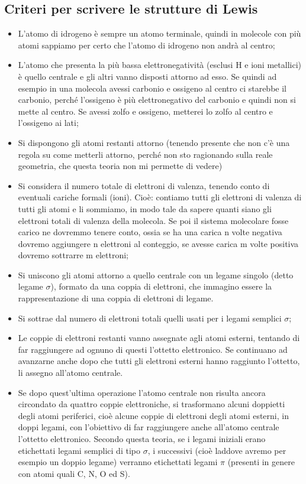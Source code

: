\subsection{Criteri per scrivere le strutture di Lewis}
\begin{itemize}
    \item L'atomo di idrogeno è sempre un atomo terminale, quindi in molecole con più atomi sappiamo per certo che l'atomo di idrogeno non andrà al centro;
    \item L'atomo che presenta la più bassa elettronegatività (esclusi H e ioni metallici) è quello centrale e gli altri vanno disposti attorno ad esso. Se quindi ad esempio in una molecola avessi carbonio e ossigeno al centro ci starebbe il carbonio, perché l'ossigeno è più elettronegativo del carbonio e quindi non si mette al centro. Se avessi zolfo e ossigeno, metterei lo zolfo al centro e l'ossigeno ai lati;
    \item Si dispongono gli atomi restanti attorno (tenendo presente che non c'è una regola su come metterli attorno, perché non sto ragionando sulla reale geometria, che questa teoria non mi permette di vedere)
    \item Si considera il numero totale di elettroni di valenza, tenendo conto di eventuali cariche formali (ioni). Cioè: contiamo tutti gli elettroni di valenza di tutti gli atomi e li sommiamo, in modo tale da sapere quanti siano gli elettroni totali di valenza della molecola. Se poi il sistema molecolare fosse carico ne dovremmo tenere conto, ossia se ha una carica n volte negativa dovremo aggiungere n elettroni al conteggio, se avesse carica m volte positiva dovremo sottrarre m elettroni;
    \item Si uniscono gli atomi attorno a quello centrale con un legame singolo (detto legame $\sigma$), formato da una coppia di elettroni, che immagino essere la rappresentazione di una coppia di elettroni di legame. 
    
    \item Si sottrae dal numero di elettroni totali quelli usati per i legami semplici $\sigma$;
    \item Le coppie di elettroni restanti vanno assegnate agli atomi esterni, tentando di far raggiungere ad ognuno di questi l'ottetto elettronico. Se continuano ad avanzarne anche dopo che tutti gli elettroni esterni hanno raggiunto l'ottetto, li assegno all'atomo centrale.
    \item Se dopo quest'ultima operazione l'atomo centrale non risulta ancora circondato da quattro coppie elettroniche, si trasformano alcuni doppietti degli atomi periferici, cioè alcune coppie di elettroni degli atomi esterni, in doppi legami, con l'obiettivo di far raggiungere anche all'atomo centrale l'ottetto elettronico. Secondo questa teoria, se i  legami iniziali erano etichettati legami semplici di tipo $\sigma$, i successivi (cioè laddove avremo per esempio un doppio legame) verranno etichettati legami $\pi$ (presenti in genere con atomi quali C, N, O ed S).
\end{itemize}

